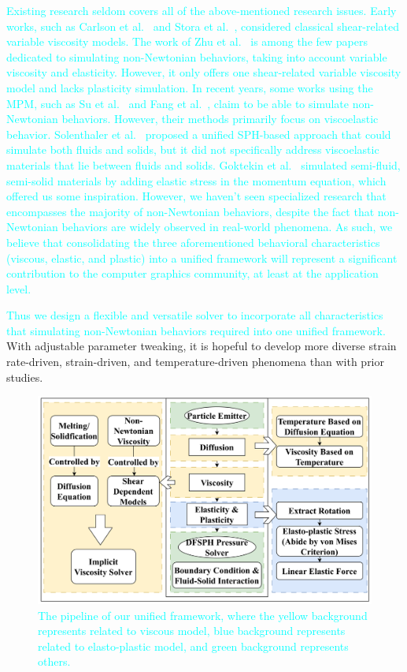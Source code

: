 \documentclass[10pt,journal,compsoc]{IEEEtran}
\newcommand{\revised}[1]{{\textcolor{cyan}{#1}}}
\begin{document}
\revised{
Existing research seldom covers all of the above-mentioned research issues. Early works, such as Carlson et al.~\cite{Carlson2002} and Stora et al.~\cite{Stora1999}, considered classical shear-related variable viscosity models. The work of Zhu et al.~\cite{Zhu2015-nonNewton} is among the few papers dedicated to simulating non-Newtonian behaviors, taking into account variable viscosity and elasticity. However, it only offers one shear-related variable viscosity model and lacks plasticity simulation. In recent years, some works using the MPM, such as Su et al.~\cite{Su2021} and Fang et al.~\cite{Fang2019-sillyRubber}, claim to be able to simulate non-Newtonian behaviors. However, their methods primarily focus on viscoelastic behavior. Solenthaler et al.~\cite{Solenthaler2007} proposed a unified SPH-based approach that could simulate both fluids and solids, but it did not specifically address viscoelastic materials that lie between fluids and solids. Goktekin et al.~\cite{Goktekin2004} simulated semi-fluid, semi-solid materials by adding elastic stress in the momentum equation, which offered us some inspiration. 
 However, we haven't seen specialized research that encompasses the majority of non-Newtonian behaviors, despite the fact that non-Newtonian behaviors are widely observed in real-world phenomena. As such, we believe that consolidating the three aforementioned behavioral characteristics (viscous, elastic, and plastic) into a unified framework will represent a significant contribution to the computer graphics community, at least at the application level. }

\revised{Thus we design a flexible and versatile solver to incorporate all characteristics that simulating non-Newtonian behaviors required into one unified framework.} With adjustable parameter tweaking, it is hopeful to develop more diverse strain rate-driven, strain-driven, and temperature-driven phenomena than with prior studies.

\begin{figure}[htbp]
	\centering
	\includegraphics[width=0.95\linewidth]{pics/pipeline.png}
	\caption{\revised{The pipeline of our unified framework, where the yellow background represents related to viscous model, blue background represents related to elasto-plastic model, and green background represents others.}}
	\label{fig:pipeline}
\end{figure}
\end{document}
